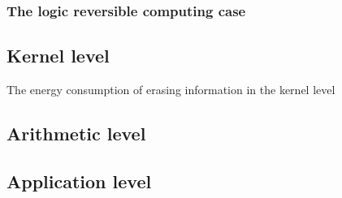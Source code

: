 \subsubsection{The logic reversible computing case}

\subsection{Kernel level}
The energy consumption of erasing information in the kernel level

\subsection{Arithmetic level}

\subsection{Application level}


